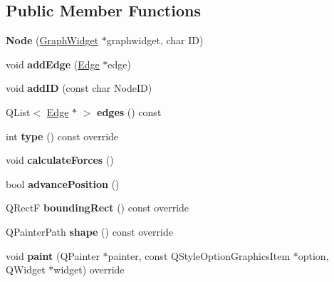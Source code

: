 \subsection*{Public Member Functions}
\begin{DoxyCompactItemize}
\item 
\mbox{\label{class_node_a862e0a2de118d7781f8e87fa001a9da7}} 
{\bfseries Node} (\mbox{\hyperlink{class_graph_widget}{Graph\+Widget}} $\ast$graphwidget, char ID)
\item 
\mbox{\label{class_node_a8c84718580556c80c447cb1818a4fd7d}} 
void {\bfseries add\+Edge} (\mbox{\hyperlink{class_edge}{Edge}} $\ast$edge)
\item 
\mbox{\label{class_node_acd604f77e24d9291c4fd46344cca078b}} 
void {\bfseries add\+ID} (const char Node\+ID)
\item 
\mbox{\label{class_node_a5ea2bb6d306e83e98c53fd1325694efd}} 
Q\+List$<$ \mbox{\hyperlink{class_edge}{Edge}} $\ast$ $>$ {\bfseries edges} () const
\item 
\mbox{\label{class_node_a3fdff8834447e56a9f3f6e9fe5cc8b97}} 
int {\bfseries type} () const override
\item 
\mbox{\label{class_node_a8265f3b5934e1984f33d3cde9899a507}} 
void {\bfseries calculate\+Forces} ()
\item 
\mbox{\label{class_node_a6e6b33f1aa6066832792d0d1b794513f}} 
bool {\bfseries advance\+Position} ()
\item 
\mbox{\label{class_node_ac0666823dd663ff7f82d69a7801599e9}} 
Q\+RectF {\bfseries bounding\+Rect} () const override
\item 
\mbox{\label{class_node_a06e21b6ed43a91cb141ce81fbce5c472}} 
Q\+Painter\+Path {\bfseries shape} () const override
\item 
\mbox{\label{class_node_ad06d8c9648b5b008406cea84474ddfb8}} 
void {\bfseries paint} (Q\+Painter $\ast$painter, const Q\+Style\+Option\+Graphics\+Item $\ast$option, Q\+Widget $\ast$widget) override
\end{DoxyCompactItemize}
